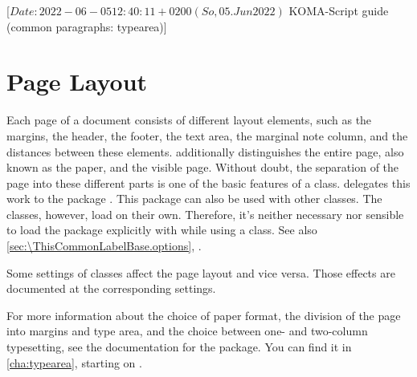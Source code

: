 %
%
%
%
%
%
%

                 [$Date: 2022-06-05 12:40:11 +0200 (So, 05. Jun 2022) $
                  KOMA-Script guide (common paragraphs: typearea)]

\section{Page Layout}
\BeginIndexGroup
{}

Each page of a document consists of different layout elements, such as the
margins, the header, the footer, the text area, the marginal note column, and
the distances between these elements. \KOMAScript{} additionally distinguishes
the entire page, also known as the paper, and the visible page. Without doubt,
the separation of the page into these different parts is one of the basic
features of a class.
\KOMAScript{} delegates this work to the package
\hyperref[cha:typearea]{}. This
package can also be used with other classes. The \KOMAScript{} classes,
however, load  on their own. Therefore, it's neither
necessary nor sensible to load the package explicitly with 
while using a \KOMAScript{} class. See also
\autoref{sec:\ThisCommonLabelBase.options},
.

Some settings of \KOMAScript{} classes affect the page layout and vice versa.
Those effects are documented at the corresponding settings.

For more information about the choice of paper format, the division of the
page into margins and type area, and the choice between one- and two-column
typesetting, see the documentation for the
\hyperref[cha:typearea]{}
package. You can find it in \autoref{cha:typearea}, starting on
.

